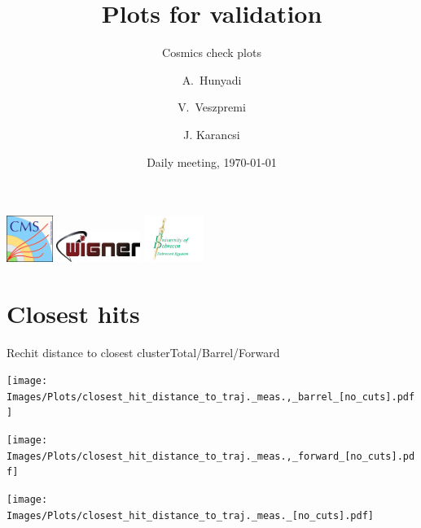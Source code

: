\documentclass{beamer}
\title{Plots for validation}
\subtitle{Cosmics check plots}
\author{A.~Hunyadi\inst{1,2} \and V.~Veszpremi\inst{1} \and J. Karancsi\inst{2}}
\institute[] %
{
  \inst{1}%
  Wigner Research Centre for Physics, Budapest
  \and
  \inst{2}%
  University of Debrecen, Debrecen
}
\date{Daily meeting, \today}
\begin{document}
\begin{frame}
  \vspace*{-0.3cm}
  \titlepage
  \vspace*{-0.5cm}
  \begin{center}
  \includegraphics[height=1.5cm]{Images/cms_logo.png}\hspace*{0.3cm}
  \includegraphics[height=1.0cm]{Images/wigner_logo.png}\hspace*{0.4cm}
  \includegraphics[height=1.5cm]{Images/egyetem_logo.png}
  \end{center}
\end{frame}

\section{Closest hits}

\begin{frame}{Rechit distance to closest cluster}{Total/Barrel/Forward}
  \begin{minipage}{0.32\textwidth}
    \centering
    \texttt{[image: Images/Plots/closest\_hit\_distance\_to\_traj.\_meas.,\_barrel\_[no\_cuts].pdf]}
  \end{minipage}%
  \hspace{0.01\textwidth}%
  \begin{minipage}{0.32\textwidth}
    \centering
    \texttt{[image: Images/Plots/closest\_hit\_distance\_to\_traj.\_meas.,\_forward\_[no\_cuts].pdf]}
  \end{minipage}%
  \hspace{0.01\textwidth}%
  \begin{minipage}{0.32\textwidth}
    \centering
    \texttt{[image: Images/Plots/closest\_hit\_distance\_to\_traj.\_meas.\_[no\_cuts].pdf]}
  \end{minipage}
\end{frame}
\end{document}
